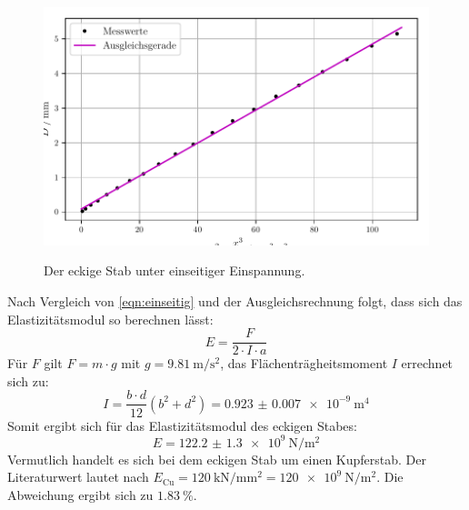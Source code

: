 \begin{figure}
  \centering
  \caption{Der eckige Stab unter einseitiger Einspannung.}
  \includegraphics[width=\textwidth]{build/plotk.pdf}
  \label{fig:eckig}
\end{figure}
Nach Vergleich von \eqref{eqn:einseitig}
und der Ausgleichsrechnung folgt, dass sich das Elastizitätsmodul so berechnen lässt:
\begin{equation*}
  E = \frac{F}{2 \cdot I \cdot a} 
\end{equation*}
Für $F$ gilt $F = m \cdot g$ mit $g=\SI{9.81}{\metre\per\second\squared}$, das Flächenträgheitsmoment $I$ errechnet sich zu:
\begin{equation*}
  I = \frac{b\cdot d}{12} (b^2 + d^2) = \SI{0.923(7)e-9}{\metre\tothe{4}}
\end{equation*}
Somit ergibt sich für das Elastizitätsmodul des eckigen Stabes:
\begin{equation*}
  E = \SI{122.2(13)e9}{\newton\per\metre\squared}
\end{equation*}
Vermutlich handelt es sich bei dem eckigen Stab um einen Kupferstab. Der Literaturwert lautet nach \cite{chemie.de}
$E_{\text{Cu}} = \SI{120}{\kilo\newton\per\milli\metre\squared} = \SI{120e9}{\newton\per\metre\squared}$. 
Die Abweichung ergibt sich zu $\SI{1.83}{\percent}$.  


